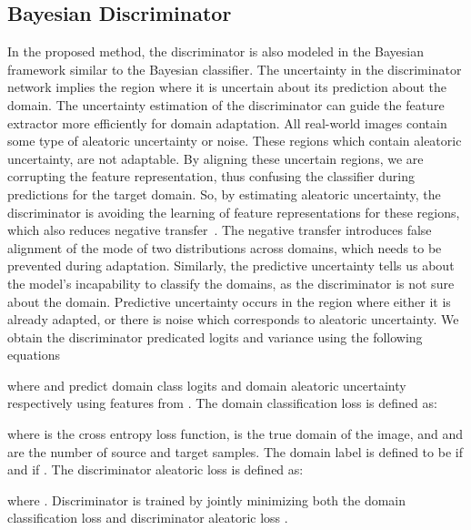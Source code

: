 \documentclass[10pt,twocolumn,letterpaper]{article}
\begin{document}
\subsection{Bayesian Discriminator}
In the proposed method, the discriminator is also modeled in the Bayesian framework similar to the Bayesian classifier. The uncertainty in the discriminator network implies the region where it is uncertain about its prediction about the domain. The uncertainty estimation of the discriminator can guide the feature extractor more efficiently for domain adaptation. All real-world images contain some type of aleatoric uncertainty or noise. These regions which contain aleatoric uncertainty, are not adaptable. 
By aligning these uncertain regions, we are corrupting the feature representation, thus confusing the classifier during predictions for the target domain. So, by estimating aleatoric uncertainty, the discriminator is avoiding the learning of feature representations for these regions, which also reduces negative transfer~\cite{pei_arxiv2018}. The negative transfer introduces false alignment of the mode of two distributions across domains, which needs to be prevented during adaptation.
Similarly, the predictive uncertainty tells us about the model's incapability to classify the domains, as the discriminator is not sure about the domain. Predictive uncertainty occurs in the region where either it is already adapted, or there is noise which corresponds to aleatoric uncertainty.
We obtain the discriminator predicated logits and variance using the following equations

where  and  predict domain class logits  and domain aleatoric uncertainty  respectively using features from .
The domain classification loss  is defined as:


where  is the cross entropy loss function,  is the true domain of the image, and   and  are the number of source and target samples. 
The domain label   is defined to be  if  and  if .
The discriminator aleatoric loss  is defined as:

 where . Discriminator is trained by jointly minimizing both the domain classification loss  and discriminator aleatoric loss .
\end{document}
